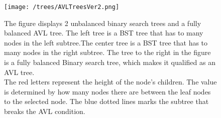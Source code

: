 \begin{figure}
	\centering
	\texttt{[image: /trees/AVLTreesVer2.png]}	
	\caption{The figure displays 2 unbalanced binary search trees and a fully balanced AVL tree. The left tree is a BST tree that has to many nodes in the left subtree.The center tree is a BST tree that has to many nodes in the right subtree. The tree to the right in the figure is a fully balanced Binary search tree, which makes it qualified as an AVL tree. \\The red letters represent the height of the node's children. The value is determined by how many nodes there are between the leaf nodes to the selected node. The blue dotted lines marks the subtree that breaks the AVL condition.}
	\label{fig:AVLTrees}
\end{figure}
